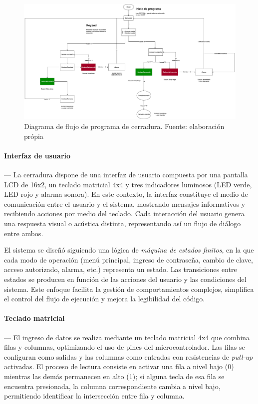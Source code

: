     \begin{figure}[H]
        \centering
        \includegraphics[width=0.9\columnwidth]{anexos/cerradura/DiagramaFlujo.png}
        \caption{Diagrama de flujo de programa de cerradura. Fuente: elaboración própia}
        \label{fig:lcd_ui}
    \end{figure}

    \vspace{1em}
    \paragraph*{\textbf{Interfaz de usuario}}---
    La cerradura dispone de una interfaz de usuario compuesta por una pantalla LCD de 16x2, un teclado matricial 4x4 y tres indicadores luminosos (LED verde, LED rojo y alarma sonora). En este contexto, la interfaz constituye el medio de comunicación entre el usuario y el sistema, mostrando mensajes informativos y recibiendo acciones por medio del teclado. Cada interacción del usuario genera una respuesta visual o acústica distinta, representando así un flujo de diálogo entre ambos.

    \vspace{1em}

    El sistema se diseñó siguiendo una lógica de \textit{máquina de estados finitos}, en la que cada modo de operación (menú principal, ingreso de contraseña, cambio de clave, acceso autorizado, alarma, etc.) representa un estado. Las transiciones entre estados se producen en función de las acciones del usuario y las condiciones del sistema. Este enfoque facilita la gestión de comportamientos complejos, simplifica el control del flujo de ejecución y mejora la legibilidad del código.

    \vspace{1em}
    \paragraph*{\textbf{Teclado matricial}}---
    El ingreso de datos se realiza mediante un teclado matricial 4x4 que combina filas y columnas, optimizando el uso de pines del microcontrolador. Las filas se configuran como salidas y las columnas como entradas con resistencias de \textit{pull-up} activadas. El proceso de lectura consiste en activar una fila a nivel bajo (0) mientras las demás permanecen en alto (1); si alguna tecla de esa fila se encuentra presionada, la columna correspondiente cambia a nivel bajo, permitiendo identificar la intersección entre fila y columna.  

